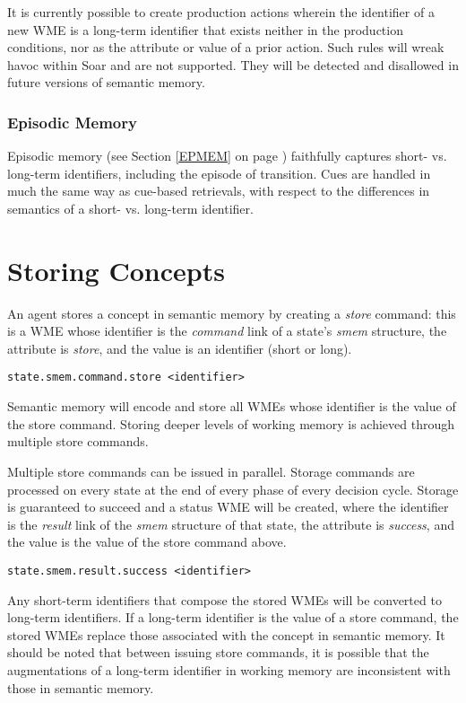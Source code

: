 It is currently possible to create production actions wherein the identifier of a new WME is a long-term identifier that exists neither in the production conditions, nor as the attribute or value of a prior action.  Such rules will wreak havoc within Soar and are not supported.  They will be detected and disallowed in future versions of semantic memory.

\subsubsection{Episodic Memory}
Episodic memory (see Section \ref{EPMEM} on page \pageref{EPMEM}) faithfully captures short- vs. long-term identifiers, including the episode of transition.  Cues are handled in much the same way as cue-based retrievals, with respect to the differences in semantics of a short- vs. long-term identifier.

\section{Storing Concepts}
\label{SMEM-store}

An agent stores a concept in semantic memory by creating a \emph{store} command: this is a WME whose identifier is the \emph{command} link of a state's \emph{smem} structure, the attribute is \emph{store}, and the value is an identifier (short or long).

\begin{verbatim}
state.smem.command.store <identifier>
\end{verbatim}

Semantic memory will encode and store all WMEs whose identifier is the value of the store command.  Storing deeper levels of working memory is achieved through multiple store commands.

Multiple store commands can be issued in parallel.  Storage commands are processed on every state at the end of every phase of every decision cycle.  Storage is guaranteed to succeed and a status WME will be created, where the identifier is the \emph{result} link of the \emph{smem} structure of that state, the attribute is \emph{success}, and the value is the value of the store command above.

\begin{verbatim}
state.smem.result.success <identifier>
\end{verbatim}

Any short-term identifiers that compose the stored WMEs will be converted to long-term identifiers. If a long-term identifier is the value of a store command, the stored WMEs replace those associated with the concept in semantic memory. It should be noted that between issuing store commands, it is possible that the augmentations of a long-term identifier in working memory are inconsistent with those in semantic memory.

